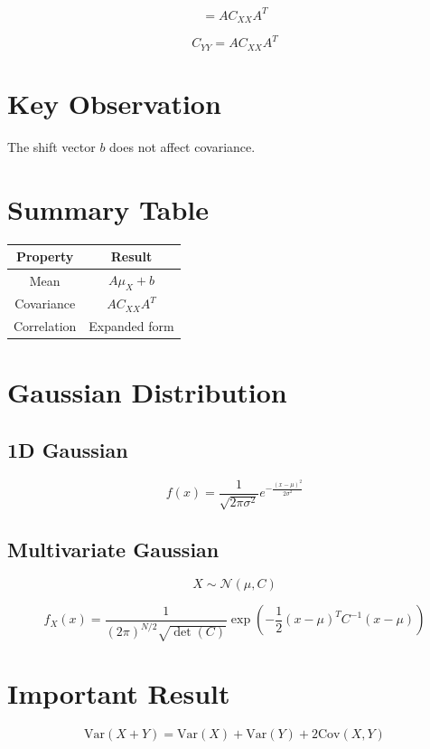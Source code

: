 \documentclass[12pt,a4paper]{article}
\begin{document}
\[
= A C_{XX} A^T
\]

\[
\boxed{C_{YY} = A C_{XX} A^T}
\]

\section{Key Observation}

The shift vector $b$ does not affect covariance.

\section{Summary Table}

\begin{center}
\begin{tabular}{|c|c|}
\hline
Property & Result \\
\hline
Mean & $A\mu_X + b$ \\
Covariance & $A C_{XX} A^T$ \\
Correlation & Expanded form \\
\hline
\end{tabular}
\end{center}

\section{Gaussian Distribution}

\subsection{1D Gaussian}

\[
f(x) = \frac{1}{\sqrt{2\pi \sigma^2}} e^{-\frac{(x-\mu)^2}{2\sigma^2}}
\]

\subsection{Multivariate Gaussian}

\[
X \sim \mathcal{N}(\mu, C)
\]

\[
f_X(x) =
\frac{1}{(2\pi)^{N/2} \sqrt{\det(C)}}
\exp\left(-\frac{1}{2}(x-\mu)^T C^{-1} (x-\mu)\right)
\]

\section{Important Result}

\[
\text{Var}(X+Y) = \text{Var}(X) + \text{Var}(Y) + 2\text{Cov}(X,Y)
\]
\end{document}
